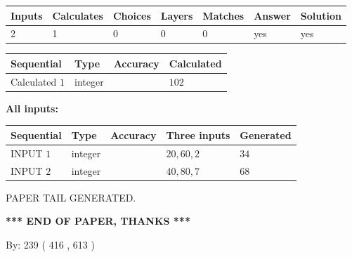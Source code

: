 \documentclass{ctexart}
\begin{document}
   
\noindent\begin{tabular}{|l|l|l|l|l|l|l|}
 \hline
Inputs & Calculates & Choices & Layers & Matches & Answer & Solution \\ \hline
 2  & 
 1  & 
 0
  & 
 0  & 
 0  & 
  yes & 
  yes 
  \\ \hline
 \end{tabular}
   
   
   
   
\noindent{}
   
   
  
  
\noindent\begin{tabular}{|l|l|l|l|}
\hline
 Sequential & Type & Accuracy & Calculated \\ 
\hline
 
 
  Calculated $  1 $ & integer &  & 
  $ 102 $ 
 \\  \hline  
 \end{tabular}
   
   
   
   
\noindent\vspace{0.1in}\hspace{-0.08in} {\textbf{\Large{All inputs: }}}
   
   
  
  
\noindent\begin{tabular}{|l|l|l|l|l|}
\hline
 Sequential & Type & Accuracy & Three inputs & Generated \\ 
\hline
 
 
  INPUT $  1 $ & integer &  & $
 20
 , 
 60
 , 
 2
 $ & $ 34 $ 
 \\  \hline  
 
 
  INPUT $  2 $ & integer &  & $
 40
 , 
 80
 , 
 7
 $ & $ 68 $ 
 \\  \hline  
 \end{tabular}
   
   
   
   
   
   
 \vspace{0.2in}
 
   
   
\vspace{2.0in} PAPER TAIL GENERATED.
   
   
   
   
\vspace{1.0in} 
{\textbf{\large{ *** END OF PAPER, THANKS *** }}} 
   
   
\hspace{1.0in} By: 
 239 ( 416 ,  613 )
   
\end{document}
